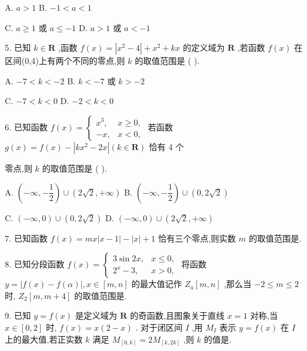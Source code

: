 A. $a > 1$ B. $- 1 < a < 1$

C. $a \geq  1$ 或 $a \leq   - 1$ D. $a > 1$ 或 $a <  - 1$

5. 已知 $k \in  \mathbf{R}$ ,函数 $f\left( x\right)  = \left| {{x}^{2} - 4}\right|  + {x}^{2} + {kx}$ 的定义域为 $\mathbf{R}$ ,若函数 $f\left( x\right)$ 在区间(0,4)上有两个不同的零点,则 $k$ 的取值范围是 (   ).

A. $- 7 < k <  - 2$ B. $k <  - 7$ 或 $k >  - 2$

C. $- 7 < k < 0$ D. $- 2 < k < 0$

6. 已知函数 $f\left( x\right)  = \left\{  \begin{array}{ll} {x}^{3}, & x \geq  0, \\   - x, & x < 0, \end{array}\right.$ 若函数 $g\left( x\right)  = f\left( x\right)  - \left| {k{x}^{2} - {2x}}\right| \left( {k \in  \mathbf{R}}\right)$ 恰有 4 个

零点,则 $k$ 的取值范围是 (   ).

A. $\left( {-\infty , - \dfrac{1}{2}}\right)  \cup  \left( {2\sqrt{2}, + \infty }\right)$ B. $\left( {-\infty , - \dfrac{1}{2}}\right)  \cup  \left( {0,2\sqrt{2}}\right)$

C. $\left( {-\infty ,0}\right)  \cup  \left( {0,2\sqrt{2}}\right)$ D. $\left( {-\infty ,0}\right)  \cup  \left( {2\sqrt{2}, + \infty }\right)$

7. 已知函数 $f\left( x\right)  = {mx}\left| {x - 1}\right|  - \left| x\right|  + 1$ 恰有三个零点,则实数 $m$ 的取值范围是\blkda{}.

8. 已知分段函数 $f\left( x\right)  = \left\{  \begin{array}{ll} 3\sin {2x}, & x \leq  0, \\  {2}^{x} - 3, & x > 0, \end{array}\right.$ 将函数 $y = \left| {f\left( x\right)  - f\left( \alpha \right) }\right| ,x \in  \left\lbrack  {m,n}\right\rbrack$ 的最大值记作 ${Z}_{a}\left\lbrack  {m,n}\right\rbrack$ ,那么当 $- 2 \leq  m \leq  2$ 时, ${Z}_{2}\left\lbrack  {m,m + 4}\right\rbrack$ 的取值范围是\blkda{}.

9. 已知 $y = f\left( x\right)$ 是定义域为 $\mathbf{R}$ 的奇函数,且图象关于直线 $x = 1$ 对称,当 $x \in  \left\lbrack  {0,2}\right\rbrack$ 时, $f\left( x\right)  = x\left( {2 - x}\right)$ . 对于闭区间 $I$ ,用 ${M}_{I}$ 表示 $y = f\left( x\right)$ 在 $I$ 上的最大值,若正实数 $k$ 满足 ${M}_{\left\lbrack  0,k\right\rbrack  } = 2{M}_{\left\lbrack  k,2k\right\rbrack  }$ ,则 $k$ 的值是\blkda{}.

